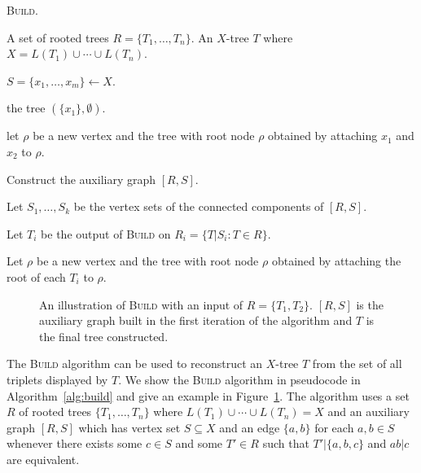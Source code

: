 \begin{algorithm}[h]
  \caption{\textsc{Build}.}
  \label{alg:build}

  \begin{algorithmic}
    \Require A set of rooted trees $R = \{T_1,\dotsc,T_n\}$.
    \Ensure  An $X$-tree $T$ where $X = L(T_1) \cup \dotsb \cup L(T_n)$.

    \State $S = \{x_1,\dotsc,x_m\} \gets X$.

     \Return the tree $(\{x_1\},\emptyset)$. \EndIf

     let $\rho$ be a new vertex and \Return the tree with root
    node $\rho$ obtained by attaching $x_1$ and $x_2$ to $\rho$. \EndIf

    \State Construct the auxiliary graph $[R,S]$.

    \State Let $S_1,\dotsc,S_k$ be the vertex sets of the connected components
    of $[R,S]$.

    \State Let $T_i$ be the output of \textsc{Build} on $R_i =
    \{T|S_i \colon T \in R\}$.
    \EndFor

    \State Let $\rho$ be a new vertex and \Return the tree with root node
    $\rho$ obtained by attaching the root of each $T_i$ to $\rho$.
    
  \end{algorithmic}
\end{algorithm}

\begin{figure}
  \centering
  
  \caption{An illustration of \textsc{Build} with an input of $R =
    \{T_1,T_2\}$.  $[R,S]$ is the auxiliary graph built in the first iteration
    of the algorithm and $T$ is the final tree constructed.}
  \label{fig:build-ex}
\end{figure}

The \textsc{Build} algorithm \cite{aho1981inferring} can be used to
reconstruct an $X$-tree $T$ from the set of all triplets displayed by $T$.  We
show the \textsc{Build} algorithm in pseudocode in Algorithm~\ref{alg:build}
and give an example in Figure~\ref{fig:build-ex}.  The algorithm uses a set
$R$ of rooted trees $\{T_1,\dotsc,T_n\}$ where $L(T_1) \cup \dotsb \cup L(T_n)
= X$ and an auxiliary graph $[R,S]$ which has vertex set $S \subseteq X$ and
an edge $\{a,b\}$ for each $a,b \in S$ whenever there exists some $c \in S$
and some $T' \in R$ such that $T'|\{a,b,c\}$ and $ab|c$ are equivalent.

